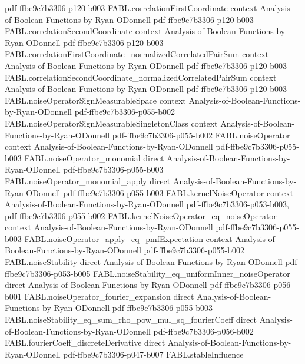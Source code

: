 \begin{theorem}
  {pdf-ffbe9c7b3306-p120-b003}
\proofstep
  {FABL.correlationFirstCoordinate}
  {context}
  {Analysis-of-Boolean-Functions-by-Ryan-ODonnell}
  {pdf-ffbe9c7b3306-p120-b003}
\proofstep
  {FABL.correlationSecondCoordinate}
  {context}
  {Analysis-of-Boolean-Functions-by-Ryan-ODonnell}
  {pdf-ffbe9c7b3306-p120-b003}
\proofstep
  {FABL.correlationFirstCoordinate_normalizedCorrelatedPairSum}
  {context}
  {Analysis-of-Boolean-Functions-by-Ryan-ODonnell}
  {pdf-ffbe9c7b3306-p120-b003}
\proofstep
  {FABL.correlationSecondCoordinate_normalizedCorrelatedPairSum}
  {context}
  {Analysis-of-Boolean-Functions-by-Ryan-ODonnell}
  {pdf-ffbe9c7b3306-p120-b003}
\proofstep
  {FABL.noiseOperatorSignMeasurableSpace}
  {context}
  {Analysis-of-Boolean-Functions-by-Ryan-ODonnell}
  {pdf-ffbe9c7b3306-p055-b002}
\proofstep
  {FABL.noiseOperatorSignMeasurableSingletonClass}
  {context}
  {Analysis-of-Boolean-Functions-by-Ryan-ODonnell}
  {pdf-ffbe9c7b3306-p055-b002}
\proofstep
  {FABL.noiseOperator}
  {context}
  {Analysis-of-Boolean-Functions-by-Ryan-ODonnell}
  {pdf-ffbe9c7b3306-p055-b003}
\proofstep
  {FABL.noiseOperator_monomial}
  {direct}
  {Analysis-of-Boolean-Functions-by-Ryan-ODonnell}
  {pdf-ffbe9c7b3306-p055-b003}
\proofstep
  {FABL.noiseOperator_monomial_apply}
  {direct}
  {Analysis-of-Boolean-Functions-by-Ryan-ODonnell}
  {pdf-ffbe9c7b3306-p055-b003}
\proofstep
  {FABL.kernelNoiseOperator}
  {context}
  {Analysis-of-Boolean-Functions-by-Ryan-ODonnell}
  {pdf-ffbe9c7b3306-p053-b003,
    pdf-ffbe9c7b3306-p055-b002}
\proofstep
  {FABL.kernelNoiseOperator_eq_noiseOperator}
  {context}
  {Analysis-of-Boolean-Functions-by-Ryan-ODonnell}
  {pdf-ffbe9c7b3306-p055-b003}
\proofstep
  {FABL.noiseOperator_apply_eq_pmfExpectation}
  {context}
  {Analysis-of-Boolean-Functions-by-Ryan-ODonnell}
  {pdf-ffbe9c7b3306-p055-b002}
\proofstep
  {FABL.noiseStability}
  {direct}
  {Analysis-of-Boolean-Functions-by-Ryan-ODonnell}
  {pdf-ffbe9c7b3306-p053-b005}
\proofstep
  {FABL.noiseStability_eq_uniformInner_noiseOperator}
  {direct}
  {Analysis-of-Boolean-Functions-by-Ryan-ODonnell}
  {pdf-ffbe9c7b3306-p056-b001}
\proofstep
  {FABL.noiseOperator_fourier_expansion}
  {direct}
  {Analysis-of-Boolean-Functions-by-Ryan-ODonnell}
  {pdf-ffbe9c7b3306-p055-b003}
\proofstep
  {FABL.noiseStability_eq_sum_rho_pow_mul_sq_fourierCoeff}
  {direct}
  {Analysis-of-Boolean-Functions-by-Ryan-ODonnell}
  {pdf-ffbe9c7b3306-p056-b002}
\proofstep
  {FABL.fourierCoeff_discreteDerivative}
  {direct}
  {Analysis-of-Boolean-Functions-by-Ryan-ODonnell}
  {pdf-ffbe9c7b3306-p047-b007}
\proofstep
  {FABL.stableInfluence}

\end{theorem}
